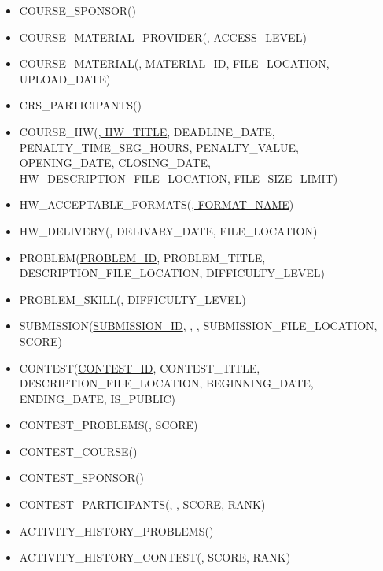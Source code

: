 \documentclass{article}
\begin{document}
\begin{flushleft}
\begin{latin}
\begin{itemize}
            \item COURSE\_SPONSOR(\underline{})
            \item COURSE\_MATERIAL\_PROVIDER(\underline{}, ACCESS\_LEVEL)
            \item COURSE\_MATERIAL(\underline{, MATERIAL\_ID}, FILE\_LOCATION, UPLOAD\_DATE)
            \item CRS\_PARTICIPANTS(\underline{})
            \item COURSE\_HW(\underline{, HW\_TITLE}, DEADLINE\_DATE, PENALTY\_TIME\_SEG\_HOURS, PENALTY\_VALUE, OPENING\_DATE, CLOSING\_DATE, HW\_DESCRIPTION\_FILE\_LOCATION, FILE\_SIZE\_LIMIT)
            \item HW\_ACCEPTABLE\_FORMATS(\underline{, FORMAT\_NAME})
            \item HW\_DELIVERY(\underline{}, DELIVARY\_DATE, FILE\_LOCATION)
            \item PROBLEM(\underline{PROBLEM\_ID}, PROBLEM\_TITLE, DESCRIPTION\_FILE\_LOCATION, DIFFICULTY\_LEVEL)
            \item PROBLEM\_SKILL(\underline{}, DIFFICULTY\_LEVEL)
            \item SUBMISSION(\underline{SUBMISSION\_ID}, , , SUBMISSION\_FILE\_LOCATION, SCORE)
            \item CONTEST(\underline{CONTEST\_ID}, CONTEST\_TITLE, DESCRIPTION\_FILE\_LOCATION, BEGINNING\_DATE, ENDING\_DATE, IS\_PUBLIC)
            \item CONTEST\_PROBLEMS(\underline{}, SCORE)
            \item CONTEST\_COURSE(\underline{})
            \item CONTEST\_SPONSOR(\underline{})
            \item CONTEST\_PARTICIPANTS(\underline{, }, SCORE, RANK)
            \item ACTIVITY\_HISTORY\_PROBLEMS(\underline{})
            \item ACTIVITY\_HISTORY\_CONTEST(\underline{}, SCORE, RANK)

\end{itemize}
\end{latin}
\end{flushleft}
\end{document}
